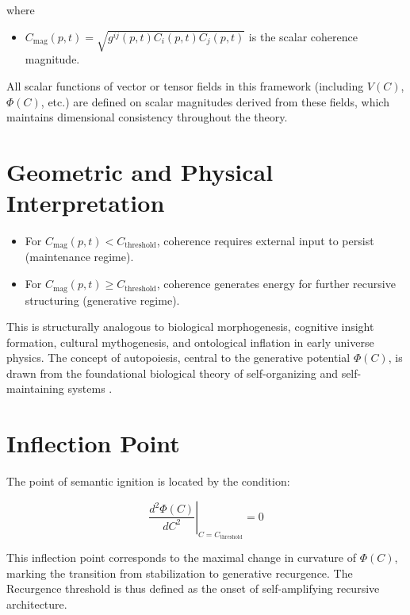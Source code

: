 where

\begin{itemize}
    \item \(C_{\mathrm{mag}}(p,t) = \sqrt{g^{ij}(p,t) C_i(p,t) C_j(p,t)}\) is the scalar coherence magnitude.
\end{itemize}

All scalar functions of vector or tensor fields in this framework (including \(V(C)\), \(\Phi(C)\), etc.) are defined on scalar magnitudes derived from these fields, which maintains dimensional consistency throughout the theory.

\section{Geometric and Physical Interpretation}

\begin{itemize}
    \item For \(C_{\mathrm{mag}}(p,t) < C_{\text{threshold}}\), coherence requires external input to persist (maintenance regime).
    \item For \(C_{\mathrm{mag}}(p,t) \geq C_{\text{threshold}}\), coherence generates energy for further recursive structuring (generative regime).
\end{itemize}

This is structurally analogous to biological morphogenesis, cognitive insight formation, cultural mythogenesis, and ontological inflation in early universe physics. The concept of autopoiesis, central to the generative potential \(\Phi(C)\), is drawn from the foundational biological theory of self-organizing and self-maintaining systems \autocite{MaturanaVarela1980}.

\section{Inflection Point}

The point of semantic ignition is located by the condition:

\begin{equation}
\left. \frac{d^2\Phi(C)}{dC^2} \right|_{C = C_{\text{threshold}}} = 0
\end{equation}

This inflection point corresponds to the maximal change in curvature of \(\Phi(C)\), marking the transition from stabilization to generative recurgence. The Recurgence threshold is thus defined as the onset of self-amplifying recursive architecture.

